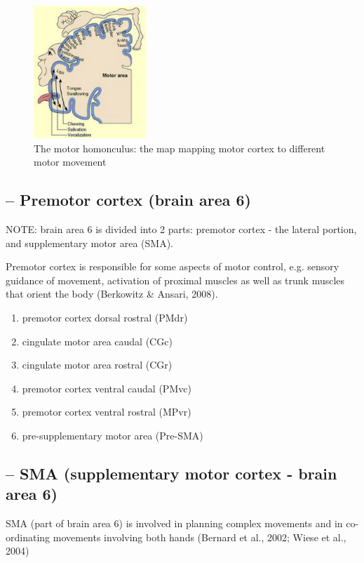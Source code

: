 \begin{figure}[hbt]
  \centerline{
  \includegraphics[height=5cm,
    angle=0]{./images/motor_homonculus.eps}}
\caption{The motor homonculus: the map mapping motor cortex to different motor
movement}
\label{fig:motor_homonculus}
\end{figure}


\subsection{-- Premotor cortex (brain area 6)}
\label{sec:premotor-cortex}

NOTE: brain area 6 is divided into 2 parts: premotor cortex - the
lateral portion, and supplementary motor area (SMA).
   
Premotor cortex is  responsible for some aspects of motor control,
   e.g.  sensory guidance of movement, activation of proximal muscles as well as trunk muscles that orient
  the body (Berkowitz \& Ansari, 2008).
  \begin{enumerate}
    \item premotor cortex dorsal rostral (PMdr)
    \item cingulate motor area caudal (CGc)
    \item cingulate motor area rostral (CGr)
    \item premotor cortex ventral caudal (PMvc)
    \item premotor cortex ventral rostral (MPvr)
    \item pre-supplementary motor area (Pre-SMA)
  \end{enumerate}

\subsection{-- SMA (supplementary motor cortex - brain area 6)}
\label{sec:SMA}

SMA (part of brain area 6) is involved in planning complex movements and in
co-ordinating movements involving both hands (Bernard
et al., 2002; Wiese et al., 2004)

